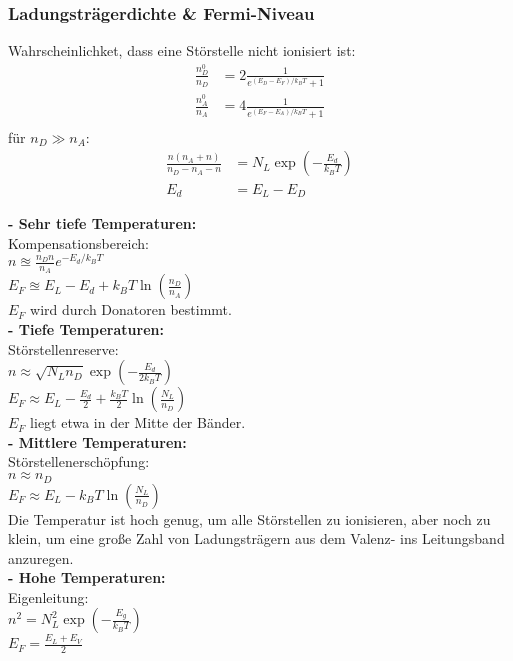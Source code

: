 \subsubsection*{Ladungsträgerdichte \& Fermi-Niveau}
Wahrscheinlichket, dass eine Störstelle nicht ionisiert ist:
\begin{equation*}
    \begin{aligned}
        \frac{n_D^0}{n_D} &= 2\frac{1}{e^{(E_D - E_F)/k_B T} +1} \\
        \frac{n_A^0}{n_A} &= 4\frac{1}{e^{(E_F - E_A)/k_B T} +1} \\
    \end{aligned}
\end{equation*}
für $n_D \gg n_A$: 
\begin{equation*}
    \begin{aligned}
        \frac{n(n_A + n)}{n_D - n_A - n} &= N_L \exp \left(- \frac{E_d}{k_B T}\right) \\
        E_d & = E_L - E_D
    \end{aligned}
\end{equation*}

\textbf{- Sehr tiefe Temperaturen:}\\
    Kompensationsbereich: \\
    $n \approxeq \frac{n_D n }{n_A} e^{-E_d / k_B T}$ \\
    $ E_F \approxeq E_L - E_d + k_B T \ln \left(\frac{n_D}{n_A}\right) $ \\
    $E_F$ wird durch Donatoren bestimmt. \\
\textbf{- Tiefe Temperaturen:} \\
    Störstellenreserve: \\
    $n \approx \sqrt{N_L n_D} \exp\left(- \frac{E_d}{2 k_B T}\right)$ \\
    $E_F \approx E_L - \frac{E_d}{2} + \frac{k_B T}{2} \ln \left(\frac{N_L}{n_D}\right)$ \\
    $E_F$ liegt etwa in der Mitte der Bänder.\\
\textbf{- Mittlere Temperaturen:} \\
    Störstellenerschöpfung: \\
    $n \approx n_D$ \\
    $E_F \approx E_L - k_B T \ln \left(\frac{N_L}{n_D}\right)$ \\
    Die Temperatur ist hoch genug, um alle Störstellen zu ionisieren, aber noch zu klein, um eine große Zahl von Ladungsträgern aus dem
    Valenz- ins Leitungsband anzuregen.\\
\textbf{- Hohe Temperaturen:} \\
    Eigenleitung: \\
    $n^2 = N_L^2 \exp \left(- \frac{E_g}{k_B T}\right)$ \\
    $E_F = \frac{E_L + E_V}{2}$ \\